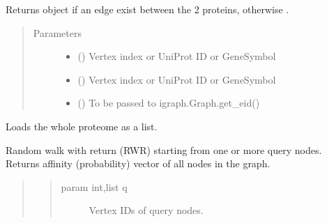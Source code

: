 \documentclass[letterpaper,10pt,english]{sphinxmanual}
\begin{document}
\begin{fulllineitems}
\begin{fulllineitems}
\label{\detokenize{main:pypath.main.PyPath.protein_edge}}
Returns  object if an edge exist between
the 2 proteins, otherwise .
\begin{quote}\begin{description}
\item[{Parameters}] \leavevmode\begin{itemize}
\item {} 
 (\sphinxstyleliteralemphasis{\sphinxupquote{,}}) \textendash{} Vertex index or UniProt ID or GeneSymbol

\item {} 
 (\sphinxstyleliteralemphasis{\sphinxupquote{,}}) \textendash{} Vertex index or UniProt ID or GeneSymbol

\item {} 
 () \textendash{} To be passed to igraph.Graph.get\_eid()

\end{itemize}

\end{description}\end{quote}

\end{fulllineitems}


\begin{fulllineitems}
\label{\detokenize{main:pypath.main.PyPath.proteome_list}}
Loads the whole proteome as a list.

\end{fulllineitems}


\begin{fulllineitems}
\label{\detokenize{main:pypath.main.PyPath.random_walk_with_return}}
Random walk with return (RWR) starting from one or more query nodes.
Returns affinity (probability) vector of all nodes in the graph.
\begin{quote}
\begin{quote}\begin{description}
\item[{param int,list q}] \leavevmode
Vertex IDs of query nodes.


\end{description}
\end{quote}
\end{quote}
\end{fulllineitems}
\end{fulllineitems}
\end{document}
